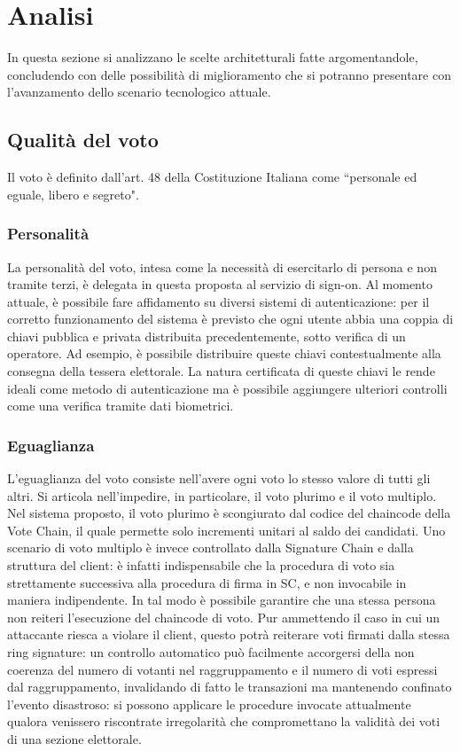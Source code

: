 \section{Analisi}
	In questa sezione si analizzano le scelte architetturali fatte argomentandole, concludendo con delle possibilità di miglioramento che si potranno presentare con l'avanzamento dello scenario tecnologico attuale.
	
	\subsection{Qualità del voto}
		Il voto è definito dall'art. 48 \cite{art48} della Costituzione Italiana come ``personale ed eguale, libero e segreto".
		\subsubsection{Personalità}\label{subsec:personalita_voto}
			La personalità del voto, intesa come la necessità di esercitarlo di persona e non tramite terzi, è delegata in questa proposta al servizio di sign-on. Al momento attuale, è possibile fare affidamento su diversi sistemi di autenticazione: per il corretto funzionamento del sistema è previsto che ogni utente abbia una coppia di chiavi pubblica e privata distribuita precedentemente, sotto verifica di un operatore. Ad esempio, è possibile distribuire queste chiavi contestualmente alla consegna della tessera elettorale. La natura certificata di queste chiavi le rende ideali come metodo di autenticazione ma è possibile aggiungere ulteriori controlli come una verifica tramite dati biometrici.
		
		\subsubsection{Eguaglianza}
			L'eguaglianza del voto consiste nell'avere ogni voto lo stesso valore di tutti gli altri. Si articola nell'impedire, in particolare, il voto plurimo e il voto multiplo. Nel sistema proposto, il voto plurimo è scongiurato dal codice del chaincode della Vote Chain, il quale permette solo incrementi unitari al saldo dei candidati. Uno scenario di voto multiplo è invece controllato dalla Signature Chain e dalla struttura del client: è infatti indispensabile che la procedura di voto sia strettamente successiva alla procedura di firma in SC, e non invocabile in maniera indipendente. In tal modo è possibile garantire che una stessa persona non reiteri l'esecuzione del chaincode di voto. Pur ammettendo il caso in cui un attaccante riesca a violare il client, questo potrà reiterare voti firmati dalla stessa ring signature: un controllo automatico può facilmente accorgersi della non coerenza del numero di votanti nel raggruppamento e il numero di voti espressi dal raggruppamento, invalidando di fatto le transazioni ma mantenendo confinato l'evento disastroso: si possono applicare le procedure invocate attualmente qualora venissero riscontrate irregolarità che compromettano la validità dei voti di una sezione elettorale.
		
